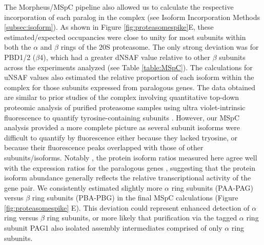 The Morpheus/MSpC pipeline also allowed us to calculate the respective incorporation of each paralog in the complex (see Isoform Incorporation Methods \ref{subsec:isoform}).
As shown in Figure \ref{fig:proteasomespike}E, these estimated/expected occupancies were close to unity for most subunits within both the $\alpha$ and $\beta$ rings of the 20S proteasome.
The only strong deviation was for PBD1/2 ($\beta$4), which  had a greater dNSAF value relative to other $\beta$ subunits across the experiments analyzed (see Table \ref{table:MSpC}).
The calculations for uNSAF values also estimated the relative proportion of each isoform within the complex for those subunits expressed from paralogous genes.
The data obtained are similar to prior studies of the complex involving quantitative top-down proteomic analysis of purified proteasome samples using ultra violet-intrinsic fluorescence to quantify tyrosine-containing subunits \citep{russell13}.
However, our MSpC analysis provided a more complete picture as several subunit isoforms were difficult to quantify by fluorescence either because they lacked tryosine, or because their fluorescence peaks overlapped with those of other subunits/isoforms.
Notably , the protein isoform ratios measured here agree well with the expression ratios for the paralogous genes \citep{book10}, suggesting that the protein isoform abundance generally reflects the relative transcriptional activity of the gene pair.
We consistently estimated slightly more $\alpha$ ring subunits (PAA-PAG) versus $\beta$ ring subunits (PBA-PBG) in the final MSpC calculations (Figure \ref{fig:proteasomespike} E).
This deviation could represent enhanced detection of $\alpha$ ring versus $\beta$ ring subunits, or more likely that purification via the tagged $\alpha$ ring subunit PAG1 also isolated assembly intermediates comprised of only $\alpha$ ring subunits.

